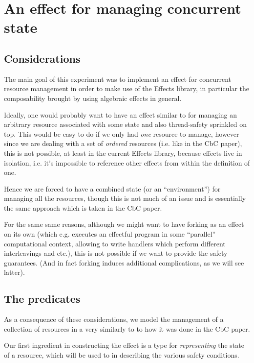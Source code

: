 \section{An effect for managing concurrent state}

\subsection{Considerations}

The main goal of this experiment was to implement an effect for concurrent
resource management in order to make use of the Effects library, in particular
the composability brought by using algebraic effects in general.

Ideally, one would probably want to have an effect similar to 
for managing an arbitrary resource associated with some state and also
thread-safety sprinkled on top. This would be easy to do if we only had
\emph{one} resource to manage, however since we are dealing with a set of
\emph{ordered} resources (i.e. like in the CbC paper), this is not possible, at
least in the current Effects library, because effects live in isolation, i.e.
it's impossible to reference other effects from within the definition of one.

Hence we are forced to have a combined state (or an ``environment'') for managing
all the resources, though this is not much of an issue and is essentially the
same approach which is taken in the CbC paper.

For the same same reasons, although we might want to have forking as an
effect on its own (which e.g. executes an effectful program in some ``parallel''
computational context, allowing to write handlers which perform different
interleavings and etc.), this is not possible if we want to provide the safety
guarantees. (And in fact forking induces additional complications, as we will
see latter).

\subsection{The predicates}

As a consequence of these considerations, we model the management of a collection
of resources in a very similarly to to how it was done in the CbC paper.

Our first ingredient in constructing the effect is a type for
\emph{representing} the state of a resource, which will be used to in
describing the various safety conditions.

